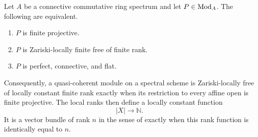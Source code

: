 \begin{theorem}
\label{thm:finite-projective-locally-free}
Let \(A\) be a connective commutative ring spectrum and let \(P\in\operatorname{Mod}_A\).
The following are equivalent.
\begin{enumerate}[label=(\roman*)]
    \item \(P\) is finite projective.
    \item \(P\) is Zariski-locally finite free of finite rank.
    \item \(P\) is perfect, connective, and flat.
\end{enumerate}
Consequently, a quasi-coherent module on a spectral scheme is
Zariski-locally free of locally constant finite rank exactly when its
restriction to every affine open is finite projective. The local ranks then
define a locally constant function
\[
    |X|
    \longrightarrow
    \mathbb N.
\]
It is a vector bundle of rank \(n\) in the sense of
 exactly when this rank function is identically
equal to \(n\).
\end{theorem}

